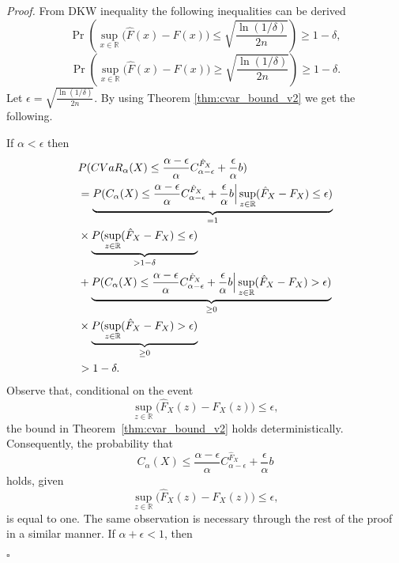 \documentclass[letterpaper]{article} %
\newenvironment{proof}{\noindent\textit{Proof.}}{\hfill$\square$}
\begin{document}
\begin{proof}
	From DKW inequality the following inequalities can be derived \cite{pmlr-v97-thomas19a}
	\begin{equation}
		\Pr \left( \sup_{x \in \mathbb{R}} \big( \hat{F}(x) - F(x) \big) 
		\leq \sqrt{\frac{\ln(1/\delta)}{2n}} \right) \geq 1 - \delta,
	\end{equation}
	\begin{equation}
		\Pr \left( \sup_{x \in \mathbb{R}} \big( \hat{F}(x) - F(x) \big) 
		\geq \sqrt{\frac{\ln(1/\delta)}{2n}} \right) \geq 1 - \delta.
	\end{equation}
	Let $\epsilon=\sqrt{\frac{\ln(1/\delta)}{2n}}$. By using Theorem \ref{thm:cvar_bound_v2} we get the following. 
	
	If $\alpha< \epsilon$ then \begin{equation}
		\begin{aligned}
			&P(CVaR_\alpha(X) \leq \frac{\alpha-\epsilon}{\alpha}C_{\alpha-\epsilon}^{\hat{F}_X} + \frac{\epsilon}{\alpha}b) \\ 
			&= \underbrace{P(C_\alpha(X) \leq \frac{\alpha-\epsilon}{\alpha}C_{\alpha-\epsilon}^{\hat{F}_X} + \frac{\epsilon}{\alpha}b\Bigr{|} \sup_{z\in\mathbb{R}}(\hat{F}_X-F_X)\leq \epsilon)}_{=1} \\ 
			&\times \underbrace{P(\sup_{z\in\mathbb{R}}(\hat{F}_X-F_X)\leq \epsilon)}_{>1-\delta} \\
			&+ \underbrace{P(C_\alpha(X) \leq \frac{\alpha-\epsilon}{\alpha}C_{\alpha-\epsilon}^{\hat{F}_X} + \frac{\epsilon}{\alpha}b\Bigr{|} \sup_{z\in\mathbb{R}}(\hat{F}_X-F_X)> \epsilon)}_{\geq 0} \\
			&\times \underbrace{P(\sup_{z\in\mathbb{R}}(\hat{F}_X-F_X)> \epsilon)}_{\geq 0} \\
			&> 1-\delta.
		\end{aligned}
	\end{equation}
	Observe that, conditional on the event 
	\[
	\sup_{z \in \mathbb{R}} \big( \hat{F}_X(z) - F_X(z) \big) \leq \epsilon,
	\]
	the bound in Theorem~\ref{thm:cvar_bound_v2} holds deterministically. Consequently, the probability that
	\[
	C_\alpha(X) \leq \frac{\alpha - \epsilon}{\alpha} C_{\alpha - \epsilon}^{\hat{F}_X} + \frac{\epsilon}{\alpha} b
	\]
	holds, given 
	\[
	\sup_{z \in \mathbb{R}} \big( \hat{F}_X(z) - F_X(z) \big) \leq \epsilon,
	\]
	is equal to one. The same observation is necessary through the rest of the proof in a similar manner.
	If $\alpha+\epsilon < 1$, then \begin{equation}
		\begin{aligned}

\end{aligned}
\end{equation}
\end{proof}
\end{document}

